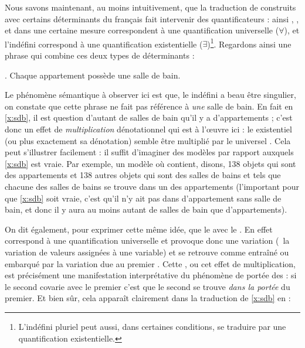 \sloppy
Nous savons maintenant, au moins intuitivement, que la traduction de
{\GN} construits avec certains déterminants du français fait
intervenir des quantificateurs : ainsi , ,
 et dans une certaine mesure 
correspondent à une quantification universelle ($\forall$), et
l'indéfini  correspond à une quantification
existentielle ($\exists$)\footnote{L'indéfini pluriel 
  peut aussi, dans certaines conditions, se traduire par une
  quantification existentielle.}.
Regardons ainsi une phrase qui combine ces deux types de déterminants :

\fussy

\ex. \label{x:sdb}
Chaque appartement possède une salle de bain. 


Le phénomène sémantique à observer ici est que, le {\GN} indéfini
 a beau être singulier, on constate que cette
phrase ne fait pas référence à \emph{une} salle de bain.  En fait en
\ref{x:sdb}, il est question d'autant de salles de bain qu'il y a
d'appartements ; c'est donc un effet de \emph{multiplication}
dénotationnel qui est à l'\oe uvre ici : le {\GN} existentiel
 (ou plus exactement sa dénotation) semble
être multiplié par le {\GN} universel .  
Cela peut s'illustrer facilement : il suffit d'imaginer des modèles par
rapport auxquels \ref{x:sdb} est vraie.  Par exemple, un modèle
 où  contient, disons, 138 objets qui sont
des appartements et 138 autres objets qui sont des salles de bains et tels
que chacune des salles de bains se trouve dans un des appartements
(l'important pour que \ref{x:sdb} soit vraie, c'est qu'il n'y ait
pas dans  d'appartement sans salle de bain, et donc il y aura
au moins autant de salles de bain que d'appartements).  

On dit également, pour exprimer cette même idée,
que le {\GN}    
avec le {\GN} 
.  
En effet  correspond à une quantification
universelle et provoque donc une variation (\ie\ la variation de valeurs
assignées à une variable) et  se retrouve comme
entraîné ou embarqué par la variation due au premier {\GN}. 
Cette , ou cet effet de
multiplication, est précisément  une manifestation interprétative du
phénomène de 
portée des {\GN} : si le second {\GN} covarie avec le premier {\GN}
c'est que le second se trouve \emph{dans la portée} du premier.  Et
bien sûr, cela apparaît clairement dans la traduction de \ref{x:sdb}
en {\LO} :

